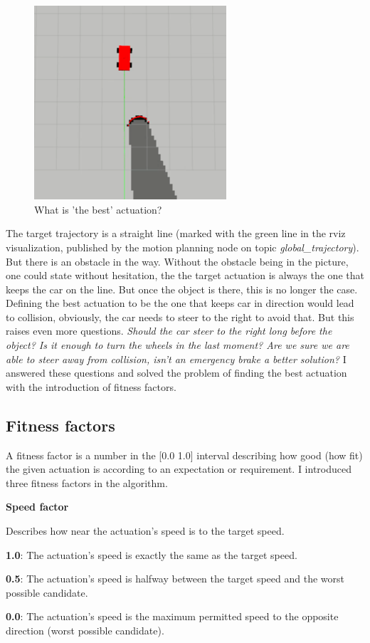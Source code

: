 \begin{figure}[!ht]
    \centering
    \includegraphics[height=72mm]{figures/raw/rviz_straight_traj_static_object.png}
    \caption{What is 'the best' actuation?}
    \label{what_is_the_best_actuation}
\end{figure}

The target trajectory is a straight line (marked with the green line in the rviz visualization, published by the motion planning node on topic \textit{global\_trajectory}). But there is an obstacle in the way. Without the obstacle being in the picture, one could state without hesitation, the the target actuation is always the one that keeps the car on the line. But once the object is there, this is no longer the case. Defining the best actuation to be the one that keeps car in direction would lead to collision, obviously, the car needs to steer to the right to avoid that. But this raises even more questions. \textit{Should the car steer to the right long before the object? Is it enough to turn the wheels in the last moment? Are we sure we are able to steer away from collision, isn't an emergency brake a better solution?} I answered these questions and solved the problem of finding the best actuation with the introduction of fitness factors.

\subsection{Fitness factors}
A fitness factor is a number in the [0.0 1.0] interval describing how good (how fit) the given actuation is according to an expectation or requirement. I introduced three fitness factors in the algorithm.

\begin{minipage}{\textwidth}
\textbf{Speed factor}

Describes how near the actuation's speed is to the target speed.

\textbf{1.0}: The actuation's speed is exactly the same as the target speed.

\textbf{0.5}: The actuation's speed is halfway between the target speed and the worst possible candidate.

\textbf{0.0}: The actuation's speed is the maximum permitted speed to the opposite direction (worst possible candidate).
\end{minipage}

